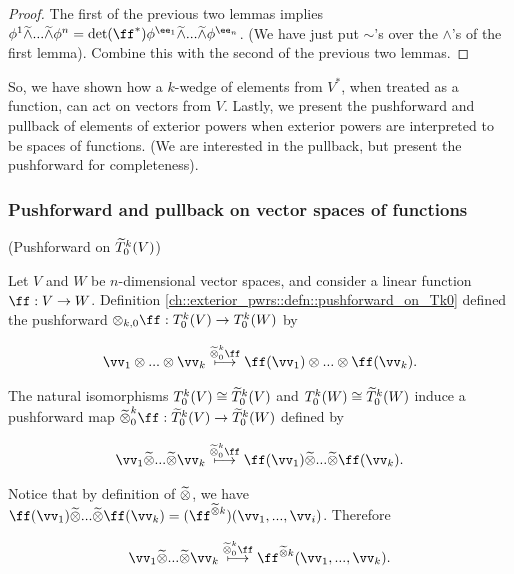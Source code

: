 \begin{proof}
   The first of the previous two lemmas implies $\phi^1 \twedge ... \twedge \phi^n = \det(\ff^*) \phi^{\ee_1} \twedge ... \twedge \phi^{\ee_n}$. (We have just put $\sim$'s over the $\wedge$'s of the first lemma). Combine this with the second of the previous two lemmas.
\end{proof}

So, we have shown how a $k$-wedge of elements from $V^*$, when treated as a function, can act on vectors from $V$. Lastly, we present the pushforward and pullback of elements of exterior powers when exterior powers are interpreted to be spaces of functions. (We are interested in the pullback, but present the pushforward for completeness).

\subsubsection{Pushforward and pullback on vector spaces of functions}

\begin{deriv}
    (Pushforward on $\widetilde{T}^k_0(V)$)
    
    Let $V$ and $W$ be $n$-dimensional vector spaces, and consider a linear function $\ff:V \rightarrow W$. Definition \ref{ch::exterior_pwrs::defn::pushforward_on_Tk0} defined the pushforward $\otimes_{k, 0} \ff: T^k_0(V) \rightarrow T^k_0(W)$ by
    
    \begin{align*}
        \vv_1 \otimes ... \otimes \vv_k \overset{\totimes^k_0 \ff}{\longmapsto} \ff(\vv_1) \otimes ... \otimes \ff(\vv_k).
    \end{align*}
    
    The natural isomorphisms $T^k_0(V) \cong \widetilde{T}^k_0(V)$ and $T^k_0(W) \cong \widetilde{T}^k_0(W)$ induce a pushforward map $\totimes^k_0 \ff:\tT^k_0(V) \rightarrow \tT^k_0(W)$ defined by
    
    \begin{align*}
        \vv_1 \totimes ... \totimes \vv_k \overset{\totimes^k_0 \ff}{\longmapsto} \ff(\vv_1) \totimes ... \totimes \ff(\vv_k).
    \end{align*}
    
    Notice that by definition of $\widetilde{\otimes}$, we have $ \ff(\vv_1) \totimes ... \totimes \ff(\vv_k) = (\ff^{\totimes k})(\vv_1, ..., \vv_i)$. Therefore
    
    \begin{align*}
        \vv_1 \totimes ... \totimes \vv_k \overset{\totimes^k_0 \ff}{\longmapsto} \ff^{\totimes k}(\vv_1, ..., \vv_k).
    \end{align*}
\end{deriv}

